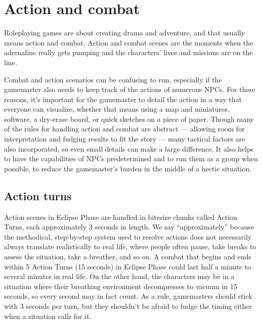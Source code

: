 



\chapter{Action and combat} \label{chap:action-combat} 

Roleplaying games are about creating drama and adventure, and that usually means action and combat. Action and combat scenes are the moments when the adrenaline really gets pumping and the characters’ lives and missions are on the line. 

Combat and action scenarios can be confusing to run, especially if the gamemaster also needs to keep track of the actions of numerous NPCs. For these reasons, it’s important for the gamemaster to detail the action in a way that everyone can visualize, whether that means using a map and miniatures, software, a dry-erase board, or quick sketches on a piece of paper. Though many of the rules for handling action and combat are abstract --- allowing room for interpretation and fudging results to fit the story --- many tactical factors are also incorporated, so even small details can make a large difference. It also helps to have the capabilities of NPCs predetermined and to run them as a group when possible, to reduce the gamemaster’s burden in the middle of a hectic situation. 



\section{Action turns} \label{sec:combat-action-turns} 

Action scenes in Eclipse Phase are handled in bitesize chunks called Action Turns, each approximately 3 seconds in length. We say ``approximately'' because the methodical, step-by-step system used to resolve actions does not necessarily always translate realistically to real life, where people often pause, take breaks to assess the situation, take a breather, and so on. A combat that begins and ends within 5 Action Turns (15 seconds) in Eclipse Phase could last half a minute to several minutes in real life. On the other hand, the characters may be in a situation where their breathing environment decompresses to vacuum in 15 seconds, so every second may in fact count. As a rule, gamemasters should stick with 3 seconds per turn, but they shouldn’t be afraid to fudge the timing either when a situation calls for it. 

